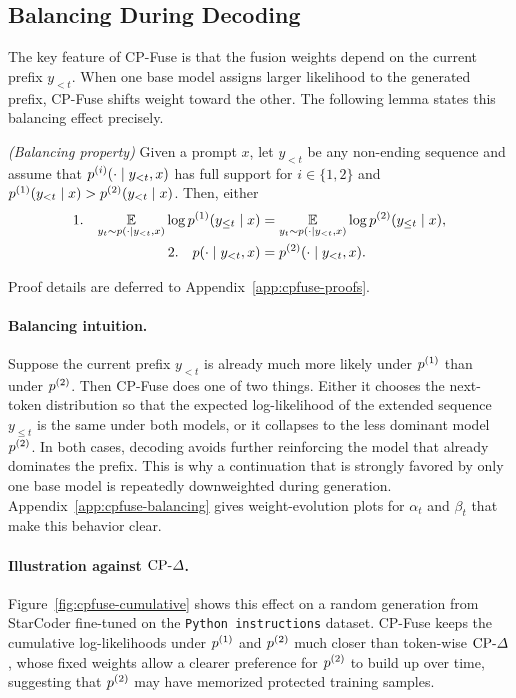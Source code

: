 \subsection{Balancing During Decoding}
\label{sec:cpfuse-balancing}

The key feature of CP-Fuse is that the fusion weights depend on the current prefix \(y_{<t}\). When one base model assigns larger likelihood to the generated prefix, CP-Fuse shifts weight toward the other. The following lemma states this balancing effect precisely.

\begin{lemma}
\label{lem:cpfuse-balance}
\emph{(Balancing property)} Given a prompt \(x\), let \(y_{<t}\) be any non-ending sequence and assume that \(p^{(i)}(\cdot \mid y_{<t},x)\) has full support for \(i \in \{1,2\}\) and \(p^{(1)}(y_{<t}\mid x) > p^{(2)}(y_{<t}\mid x)\). Then, either
\begin{align*}
1.\quad
\underset{y_t \sim p(\cdot \mid y_{<t},x)}{\mathbb{E}}
\log p^{(1)}(y_{\leq t}\mid x)
&=
\underset{y_t \sim p(\cdot \mid y_{<t},x)}{\mathbb{E}}
\log p^{(2)}(y_{\leq t}\mid x), \\
2.\quad
p(\cdot \mid y_{<t},x)
&=
p^{(2)}(\cdot \mid y_{<t},x).
\end{align*}
\end{lemma}

Proof details are deferred to Appendix~\ref{app:cpfuse-proofs}.

\paragraph{Balancing intuition.}
Suppose the current prefix \(y_{<t}\) is already much more likely under \(p^{(1)}\) than under \(p^{(2)}\). Then CP-Fuse does one of two things. Either it chooses the next-token distribution so that the expected log-likelihood of the extended sequence \(y_{\leq t}\) is the same under both models, or it collapses to the less dominant model \(p^{(2)}\). In both cases, decoding avoids further reinforcing the model that already dominates the prefix. This is why a continuation that is strongly favored by only one base model is repeatedly downweighted during generation. Appendix~\ref{app:cpfuse-balancing} gives weight-evolution plots for \(\alpha_t\) and \(\beta_t\) that make this behavior clear.

\paragraph{Illustration against \(\text{CP-}\Delta\).}
Figure~\ref{fig:cpfuse-cumulative} shows this effect on a random generation from StarCoder fine-tuned on the \texttt{Python instructions} dataset. CP-Fuse keeps the cumulative log-likelihoods under \(p^{(1)}\) and \(p^{(2)}\) much closer than token-wise \(\text{CP-}\Delta\), whose fixed weights allow a clearer preference for \(p^{(2)}\) to build up over time, suggesting that \(p^{(2)}\) may have memorized protected training samples.

